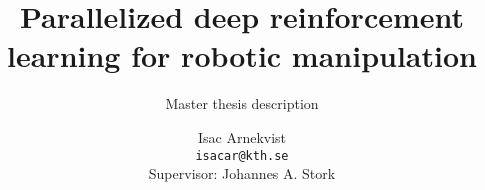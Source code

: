 \documentclass[12pt,a4paper]{scrartcl}
\title{Parallelized deep reinforcement learning for robotic manipulation}
\subtitle{Master thesis description}
\author{Isac Arnekvist \\ \texttt{isacar@kth.se} \\ Supervisor: Johannes A. Stork}
\begin{document}
\maketitle


{}

\end{document}
